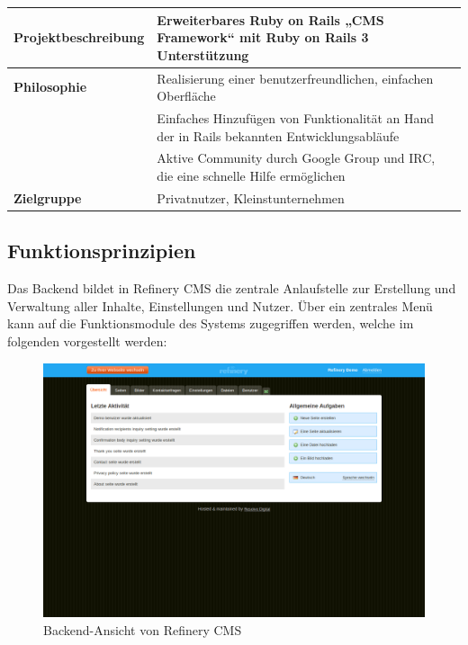 \begin{table}[!h]
\begin{tabular}[!ht]{|l|l|l|}
\hline
\textbf{Projektbeschreibung} & \multicolumn{2}{p{10cm}|}{Erweiterbares Ruby on Rails „CMS Framework“ mit  Ruby on Rails 3 Unterstützung} \\
\hline
\textbf{Philosophie} & \multicolumn{2}{p{10cm}|}{Realisierung einer benutzerfreundlichen, einfachen Oberfläche} \\
& \multicolumn{2}{p{10cm}|}{Einfaches Hinzufügen von Funktionalität an Hand der in Rails bekannten Entwicklungsabläufe}\\
& \multicolumn{2}{p{10cm}|}{Aktive Community durch Google Group und IRC, die eine schnelle Hilfe ermöglichen}\\
\hline
\textbf{Zielgruppe} & \multicolumn{2}{p{10cm}|}{Privatnutzer, Kleinstunternehmen} \\
\hline
\end{tabular}
\end{table}
\subsection{Funktionsprinzipien}
Das Backend bildet in Refinery CMS die zentrale Anlaufstelle zur Erstellung und Verwaltung aller Inhalte, Einstellungen und Nutzer. Über ein zentrales Menü kann auf die Funktionsmodule des Systems zugegriffen werden, welche im folgenden vorgestellt werden:
\begin{figure}[!h]
\begin{center}
\includegraphics[scale=0.3]{images/analyse/refinery/backendrefinery.png}
\caption{Backend-Ansicht von Refinery CMS}
\label{refinerybackend}
\end{center}
\end{figure}

